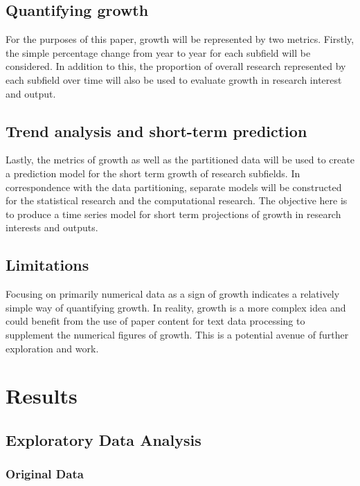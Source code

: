 \documentclass[
  12pt]{article}
\begin{document}
\subsection{Quantifying growth}\label{quantifying-growth}

For the purposes of this paper, growth will be represented by two
metrics. Firstly, the simple percentage change from year to year for
each subfield will be considered. In addition to this, the proportion of
overall research represented by each subfield over time will also be
used to evaluate growth in research interest and output.

\subsection{Trend analysis and short-term
prediction}\label{trend-analysis-and-short-term-prediction}

Lastly, the metrics of growth as well as the partitioned data will be
used to create a prediction model for the short term growth of research
subfields. In correspondence with the data partitioning, separate models
will be constructed for the statistical research and the computational
research. The objective here is to produce a time series model for short
term projections of growth in research interests and outputs.

\subsection{Limitations}\label{limitations}

Focusing on primarily numerical data as a sign of growth indicates a
relatively simple way of quantifying growth. In reality, growth is a
more complex idea and could benefit from the use of paper content for
text data processing to supplement the numerical figures of growth. This
is a potential avenue of further exploration and work.

\section{Results}\label{sec-results}

\subsection{Exploratory Data Analysis}\label{exploratory-data-analysis}

\subsubsection{Original Data}\label{original-data}
\end{document}
